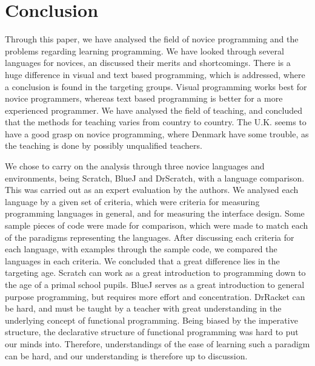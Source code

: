 \chapter{Conclusion}
\label{chap:conclusion}

Through this paper, we have analysed the field of novice programming and the problems regarding learning programming. We have looked through several languages for novices, an discussed their merits and shortcomings. There is a huge difference in visual and text based programming, which is addressed, where a conclusion is found in the targeting groups. Visual programming works best for novice programmers, whereas text based programming is better for a more experienced programmer. We have analysed the field of teaching, and concluded that the methods for teaching varies from country to country. The U.K. seems to have a good grasp on novice programming, where Denmark have some trouble, as the teaching is done by possibly unqualified teachers.

We chose to carry on the analysis through three novice languages and environments, being Scratch, BlueJ and DrScratch, with a language comparison. This was carried out as an expert evaluation by the authors. We analysed each language by a given set of criteria, which were criteria for measuring programming languages in general, and for measuring the interface design. Some sample pieces of code were made for comparison, which were made to match each of the paradigms representing the languages. After discussing each criteria for each language, with examples through the sample code, we compared the languages in each criteria. We concluded that a great difference lies in the targeting age. Scratch can work as a great introduction to programming down to the age of a primal school pupils. BlueJ serves as a great introduction to general purpose programming, but requires more effort and concentration. DrRacket can be hard, and must be taught by a teacher with great understanding in the underlying concept of functional programming. Being biased by the imperative structure, the declarative structure of functional programming was hard to put our minds into. Therefore, understandings of the ease of learning such a paradigm can be hard, and our understanding is therefore up to discussion.



